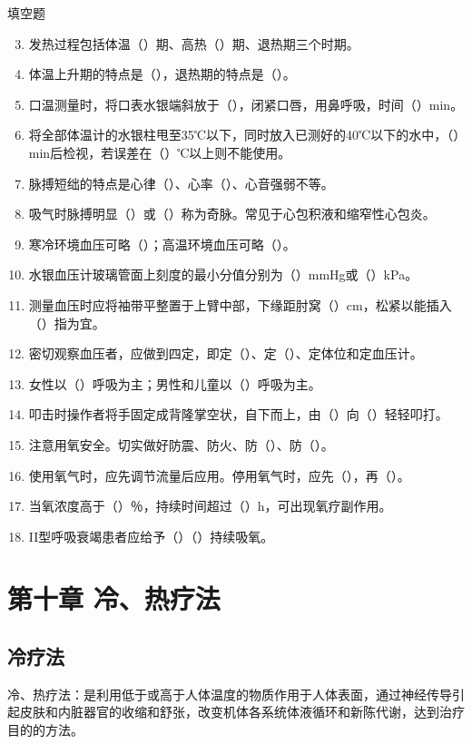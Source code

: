 \documentclass[11pt, a4paper]{ctexart}
\begin{document}
\begin{tipsbox}{填空题}
	\begin{enumerate}
		\setcounter{enumi}{2}
		\item 发热过程包括体温（\qquad）期、高热（\qquad）期、退热期三个时期。
		\item 体温上升期的特点是（\qquad），退热期的特点是（\qquad）。
		\item 口温测量时，将口表水银端斜放于（\qquad），闭紧口唇，用鼻呼吸，时间（\qquad）min。
		\item 将全部体温计的水银柱甩至35℃以下，同时放入已测好的40℃以下的水中，（\qquad）min后检视，若误差在（\qquad）℃以上则不能使用。
		\item 脉搏短绌的特点是心律（\qquad）、心率（\qquad）、心音强弱不等。
		\item 吸气时脉搏明显（\qquad）或（\qquad）称为奇脉。常见于心包积液和缩窄性心包炎。
		\item 寒冷环境血压可略（\qquad）；高温环境血压可略（\qquad）。
		\item 水银血压计玻璃管面上刻度的最小分值分别为（\qquad）mmHg或（\qquad）kPa。
		\item 测量血压时应将袖带平整置于上臂中部，下缘距肘窝（\qquad）cm，松紧以能插入（\qquad）指为宜。
		\item 密切观察血压者，应做到四定，即定（\qquad）、定（\qquad）、定体位和定血压计。
		\item 女性以（\qquad）呼吸为主；男性和儿童以（\qquad）呼吸为主。
		\item 叩击时操作者将手固定成背隆掌空状，自下而上，由（\qquad）向（\qquad）轻轻叩打。
		\item 注意用氧安全。切实做好防震、防火、防（\qquad）、防（\qquad）。
		\item 使用氧气时，应先调节流量后应用。停用氧气时，应先（\qquad），再（\qquad）。
		\item 当氧浓度高于（\qquad）％，持续时间超过（\qquad）h，可出现氧疗副作用。
		\item II型呼吸衰竭患者应给予（\qquad）（\qquad）持续吸氧。
	\end{enumerate}
\end{tipsbox}

\section{第十章 冷、热疗法}
\subsection{冷疗法}
冷、热疗法：是利用低于或高于人体温度的物质作用于人体表面，通过神经传导引起皮肤和内脏器官的收缩和舒张，改变机体各系统体液循环和新陈代谢，达到治疗目的的方法。
\end{document}
